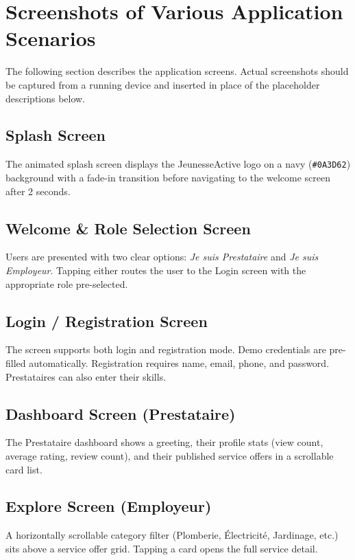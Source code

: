 \documentclass[12pt,a4paper]{report}
\begin{document}
\section{Screenshots of Various Application Scenarios}

\begin{tcolorbox}[colback=lightgray, colframe=primary!40, title=Note on Screenshots]
The following section describes the application screens. Actual screenshots should be captured from a running device and inserted in place of the placeholder descriptions below.
\end{tcolorbox}

\subsection{Splash Screen}
The animated splash screen displays the JeunesseActive logo on a navy (\texttt{\#0A3D62}) background with a fade-in transition before navigating to the welcome screen after 2 seconds.

\subsection{Welcome \& Role Selection Screen}
Users are presented with two clear options: \textit{Je suis Prestataire} and \textit{Je suis Employeur}. Tapping either routes the user to the Login screen with the appropriate role pre-selected.

\subsection{Login / Registration Screen}
The screen supports both login and registration mode. Demo credentials are pre-filled automatically. Registration requires name, email, phone, and password. Prestataires can also enter their skills.

\subsection{Dashboard Screen (Prestataire)}
The Prestataire dashboard shows a greeting, their profile stats (view count, average rating, review count), and their published service offers in a scrollable card list.

\subsection{Explore Screen (Employeur)}
A horizontally scrollable category filter (Plomberie, Électricité, Jardinage, etc.) sits above a service offer grid. Tapping a card opens the full service detail.
\end{document}
